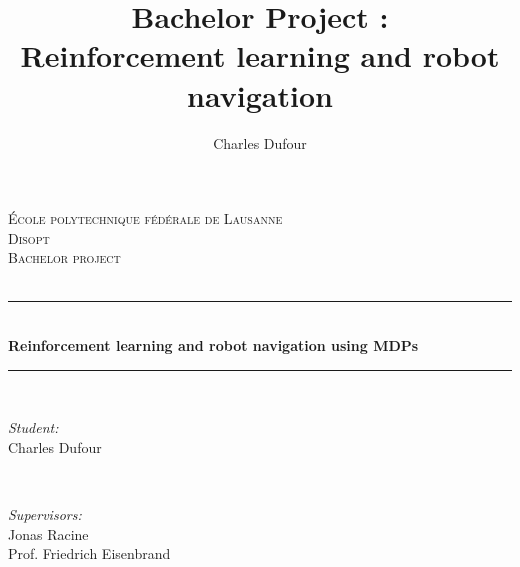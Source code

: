 \documentclass[14pt,a4paper]{article}
\author{Charles Dufour}
\title{Bachelor Project : \\
Reinforcement learning and robot navigation}
\theoremstyle{definition}
\begin{document}
\begin{titlepage}
\newcommand{\HRule}{\rule{\linewidth}{0.5mm}} %

\center %
 

\vspace{3cm}
\textsc{\LARGE \'Ecole polytechnique f\'ed\'erale de Lausanne}\\[0.5cm] %
\textsc{\large Disopt}\\[1.5cm] %
\textsc{\LARGE Bachelor project}\\[0.5cm] %
\textsc{\large }\\[0.5cm] %


\HRule \\[0.4cm]
{ \huge \bfseries Reinforcement learning and robot navigation\vspace{0.3cm} using MDPs}\\[0.4cm] %
\HRule \\[1.5cm]
 

\begin{minipage}{0.4\textwidth}
\begin{flushleft} \large
\emph{Student:}\\
Charles Dufour
\end{flushleft}
\end{minipage}
~
\begin{minipage}{0.4\textwidth}
\begin{flushright} \large
\emph{Supervisors:} \\
Jonas Racine\\%
Prof. Friedrich Eisenbrand 
\end{flushright}
\end{minipage}\\[5cm]


\end{titlepage}
\end{document}
